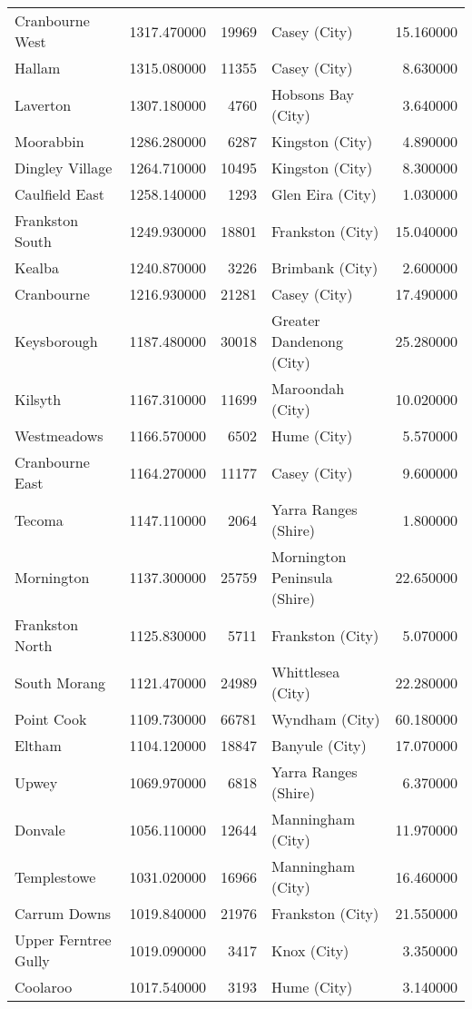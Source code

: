 \begin{table}
\begin{tabular}{lrrlr}
Cranbourne West & 1317.470000 & 19969 & Casey (City) & 15.160000 \\
Hallam & 1315.080000 & 11355 & Casey (City) & 8.630000 \\
Laverton & 1307.180000 & 4760 & Hobsons Bay (City) & 3.640000 \\
Moorabbin & 1286.280000 & 6287 & Kingston (City) & 4.890000 \\
Dingley Village & 1264.710000 & 10495 & Kingston (City) & 8.300000 \\
Caulfield East & 1258.140000 & 1293 & Glen Eira (City) & 1.030000 \\
Frankston South & 1249.930000 & 18801 & Frankston (City) & 15.040000 \\
Kealba & 1240.870000 & 3226 & Brimbank (City) & 2.600000 \\
Cranbourne & 1216.930000 & 21281 & Casey (City) & 17.490000 \\
Keysborough & 1187.480000 & 30018 & Greater Dandenong (City) & 25.280000 \\
Kilsyth & 1167.310000 & 11699 & Maroondah (City) & 10.020000 \\
Westmeadows & 1166.570000 & 6502 & Hume (City) & 5.570000 \\
Cranbourne East & 1164.270000 & 11177 & Casey (City) & 9.600000 \\
Tecoma & 1147.110000 & 2064 & Yarra Ranges (Shire) & 1.800000 \\
Mornington & 1137.300000 & 25759 & Mornington Peninsula (Shire) & 22.650000 \\
Frankston North & 1125.830000 & 5711 & Frankston (City) & 5.070000 \\
South Morang & 1121.470000 & 24989 & Whittlesea (City) & 22.280000 \\
Point Cook & 1109.730000 & 66781 & Wyndham (City) & 60.180000 \\
Eltham & 1104.120000 & 18847 & Banyule (City) & 17.070000 \\
Upwey & 1069.970000 & 6818 & Yarra Ranges (Shire) & 6.370000 \\
Donvale & 1056.110000 & 12644 & Manningham (City) & 11.970000 \\
Templestowe & 1031.020000 & 16966 & Manningham (City) & 16.460000 \\
Carrum Downs & 1019.840000 & 21976 & Frankston (City) & 21.550000 \\
Upper Ferntree Gully & 1019.090000 & 3417 & Knox (City) & 3.350000 \\
Coolaroo & 1017.540000 & 3193 & Hume (City) & 3.140000 \\

\end{tabular}
\end{table}
